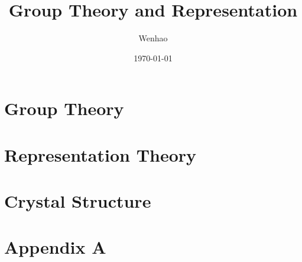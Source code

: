 \documentclass{article}
\begin{document}
\title{Group Theory and Representation}
\author{Wenhao}
\date{\today}
\maketitle

\section{Group Theory}

\section{Representation Theory}

\section{Crystal Structure}

\pagebreak
\section*{Appendix A}
\end{document}
